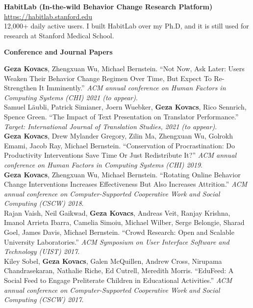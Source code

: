 \documentclass[10pt,A4]{article}
\newcommand{\cvsection}[1]
{
	\begin{center}
		\large\textcolor{sectcol}{\textbf{#1}}
	\end{center}
}
\begin{document}
\textbf{HabitLab (In-the-wild Behavior Change Research Platform)} \hfill \url{https://habitlab.stanford.edu}\\ %
\textcolor{sectcol}{12,000+ daily active users.} I built HabitLab over my Ph.D, and it is still used for research at Stanford Medical School.\\ %


\cvsection{Conference and Journal Papers}

\textbf{Geza Kovacs}, Zhengxuan Wu, Michael Bernstein. ``Not Now, Ask Later: Users Weaken Their Behavior Change Regimen Over Time, But Expect To Re-Strengthen It Imminently.'' \emph{ACM annual conference on Human Factors in Computing Systems (CHI) 2021 (to appear)}.\\ %

Samuel Läubli, Patrick Simianer, Joern Wuebker, \textbf{Geza Kovacs}, Rico Sennrich, Spence Green. ``The Impact of Text Presentation on Translator Performance.'' \emph{Target: International Journal of Translation Studies, 2021 (to appear)}.\\

\textbf{Geza Kovacs}, Drew Mylander Gregory, Zilin Ma, Zhengxuan Wu, Golrokh Emami, Jacob Ray, Michael Bernstein. ``Conservation of Procrastination: Do Productivity Interventions Save Time Or Just Redistribute It?'' \emph{ACM annual conference on Human Factors in Computing Systems (CHI) 2019}.\\ %

\textbf{Geza Kovacs}, Zhengxuan Wu, Michael Bernstein. ``Rotating Online Behavior Change Interventions Increases Effectiveness But Also Increases Attrition.'' \emph{ACM annual conference on Computer-Supported Cooperative Work and Social Computing (CSCW) 2018}.\\ %

Rajan Vaish, Neil Gaikwad, \textbf{Geza Kovacs}, Andreas Veit, Ranjay Krishna, Imanol Arrieta Ibarra, Camelia Simoiu, Michael Wilber, Serge Belongie, Sharad Goel, James Davis, Michael Bernstein. ``Crowd Research: Open and Scalable University Laboratories.'' \emph{ACM Symposium on User Interface Software and Technology (UIST) 2017}.\\ %

Kiley Sobel, \textbf{Geza Kovacs}, Galen McQuillen, Andrew Cross, Nirupama Chandrasekaran, Nathalie Riche, Ed Cutrell, Meredith Morris. ``EduFeed: A Social Feed to Engage Preliterate Children in Educational Activities.'' \emph{ACM annual conference on Computer-Supported Cooperative Work and Social Computing (CSCW) 2017}.\\ %
\end{document}
